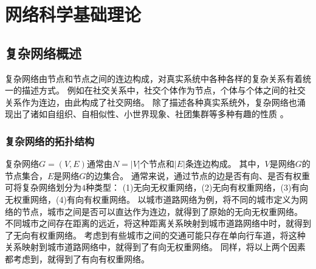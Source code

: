 \section{网络科学基础理论}
\subsection{复杂网络概述}
复杂网络由节点和节点之间的连边构成，对真实系统中各种各样的复杂关系有着统一的描述方式。
例如在社交关系中，社交个体作为节点，个体与个体之间的社交关系作为连边，由此构成了社交网络。
除了描述各种真实系统外，复杂网络也涌现出了诸如自组织、自相似性、小世界现象、社团集群等多种有趣的性质 \cite{Strogatz2001}。

\subsubsection{复杂网络的拓扑结构}
复杂网络$ G = (V, E) $通常由$ N=|V| $个节点和$ |E| $条连边构成。
其中，$ V $是网络$ G $的节点集合，$ E $是网络$ G $的边集合。
通常来说，通过节点的边是否有向、是否有权重可将复杂网络划分为$ 4 $种类型：
(1)无向无权重网络，(2)无向有权重网络，(3)有向无权重网络，(4)有向有权重网络。
以城市道路网络为例，将不同的城市定义为网络的节点，城市之间是否可以直达作为连边，就得到了原始的无向无权重网络。
不同城市之间存在距离的远近，将这种距离关系映射到城市道路网络中时，就得到了无向有权重网络。
考虑到有些城市之间的交通可能只存在单向行车道，将这种关系映射到城市道路网络中，就得到了有向无权重网络。
同样，将以上两个因素都考虑到，就得到了有向有权重网络。

